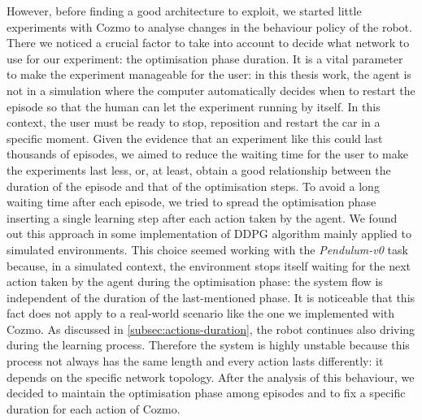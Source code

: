 However, before finding a good architecture to exploit, we started little experiments with Cozmo to analyse changes in the behaviour policy of the robot.
There we noticed a crucial factor to take into account to decide what network to use for our experiment: the optimisation phase duration.
It is a vital parameter to make the experiment manageable for the user: in this thesis work, the agent is not in a simulation where the computer automatically decides when to restart the episode so that the human can let the experiment running by itself.
In this context, the user must be ready to stop, reposition and restart the car in a specific moment.
Given the evidence that an experiment like this could last thousands of episodes, we aimed to reduce the waiting time for the user to make the experiments last less, or, at least, obtain a good relationship between the duration of the episode and that of the optimisation steps.
To avoid a long waiting time after each episode, we tried to spread the optimisation phase inserting a single learning step after each action taken by the agent. We found out this approach in some implementation of DDPG algorithm mainly applied to simulated environments. This choice seemed working with the \textit{Pendulum-v0} task because, in a simulated context, the environment stops itself waiting for the next action taken by the agent during the optimisation phase: the system flow is independent of the duration of the last-mentioned phase.
It is noticeable that this fact does not apply to a real-world scenario like the one we implemented with Cozmo. As discussed in \vref{subsec:actions-duration}, the robot continues also driving during the learning process.
Therefore the system is highly unstable because this process not always has the same length and every action lasts differently: it depends on the specific network topology.
After the analysis of this behaviour, we decided to maintain the optimisation phase among episodes and to fix a specific duration for each action of Cozmo.


